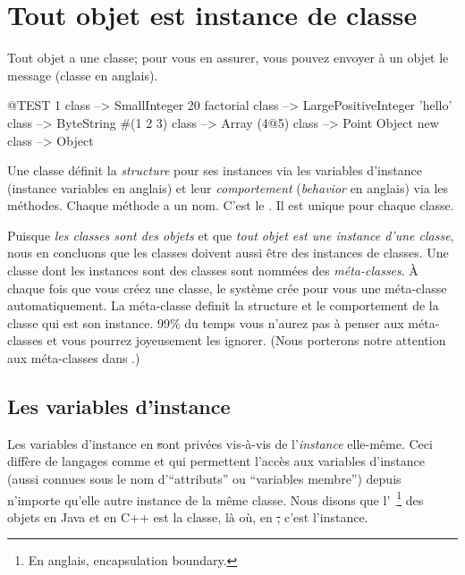 \documentclass[a4paper,10pt,twoside]{book}
\begin{document}
\section{Tout objet est instance de classe}


Tout objet a une classe; pour vous en assurer, vous pouvez envoyer \`a un objet le message  (classe en anglais).

\begin{code}{@TEST}
1 class                 --> SmallInteger 
20 factorial class --> LargePositiveInteger
'hello' class          --> ByteString
#(1 2 3) class       --> Array
(4@5) class         --> Point
Object new class --> Object
\end{code}

Une classe d\'efinit la \emph{structure} pour ses instances via les variables d'instance (instance variables en anglais)
et leur \emph{comportement} (\emph{behavior} en anglais) via les m\'ethodes.
Chaque m\'ethode a un nom. C'est le . Il est unique pour chaque classe.

Puisque \emph{les classes sont des objets} et que \emph{tout objet est une instance d'une classe}, nous en concluons que les classes doivent aussi \^etre des instances de classes.
Une classe dont les instances sont des classes sont nomm\'ees des \emph{m\'eta-classes}.
\`A chaque fois que vous cr\'eez une classe, le syst\`eme cr\'ee pour vous une m\'eta-classe
automatiquement.
La m\'eta-classe definit la structure et le comportement de la classe qui est son instance.
99\% du temps vous n'aurez pas \`a penser aux m\'eta-classes et vous pourrez joyeusement les ignorer.
(Nous porterons notre attention aux m\'eta-classes dans .)

\subsection{Les variables d'instance}

Les variables d'instance en \st sont priv\'ees vis-\`a-vis de l'\emph{instance} elle-m\^eme.
Ceci diff\`ere de langages comme  et  qui permettent l'acc\`es aux variables d'instance (aussi connues sous le nom d'``attributs'' ou ``variables membre'') depuis n'importe qu'elle autre instance de la m\^eme classe.
Nous disons que l'~\footnote{En anglais, encapsulation boundary.} des objets en Java et en C++ est la classe, l\`a o\`u, en \st, c'est l'instance.
\end{document}
